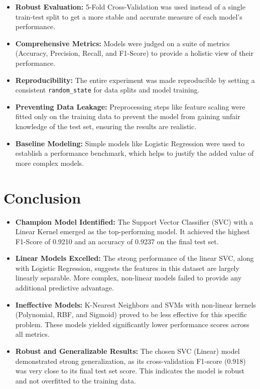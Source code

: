 \documentclass[12pt]{article}
\begin{document}
\begin{itemize}
    \item \textbf{Robust Evaluation:} 5-Fold Cross-Validation was used instead of a single train-test split to get a more stable and accurate measure of each model's performance.

    \item \textbf{Comprehensive Metrics:} Models were judged on a suite of metrics (Accuracy, Precision, Recall, and F1-Score) to provide a holistic view of their performance.

    \item \textbf{Reproducibility:} The entire experiment was made reproducible by setting a consistent \texttt{random\_state} for data splits and model training.

    \item \textbf{Preventing Data Leakage:} Preprocessing steps like feature scaling were fitted only on the training data to prevent the model from gaining unfair knowledge of the test set, ensuring the results are realistic.
    
    \item \textbf{Baseline Modeling:} Simple models like Logistic Regression were used to establish a performance benchmark, which helps to justify the added value of more complex models.
\end{itemize}

\section{Conclusion}
\begin{itemize}
    \item \textbf{Champion Model Identified:} The Support Vector Classifier (SVC) with a Linear Kernel emerged as the top-performing model. It achieved the highest F1-Score of 0.9210 and an accuracy of 0.9237 on the final test set.

    \item \textbf{Linear Models Excelled:} The strong performance of the linear SVC, along with Logistic Regression, suggests the features in this dataset are largely linearly separable. More complex, non-linear models failed to provide any additional predictive advantage.

    \item \textbf{Ineffective Models:} K-Nearest Neighbors and SVMs with non-linear kernels (Polynomial, RBF, and Sigmoid) proved to be less effective for this specific problem. These models yielded significantly lower performance scores across all metrics.

    \item \textbf{Robust and Generalizable Results:} The chosen SVC (Linear) model demonstrated strong generalization, as its cross-validation F1-score (0.918) was very close to its final test set score. This indicates the model is robust and not overfitted to the training data.
\end{itemize}
\end{document}
